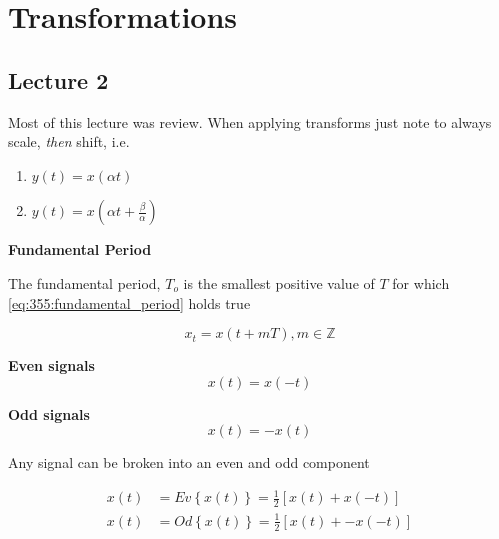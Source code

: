 \documentclass[10pt]{article}
\begin{document}
\section{Transformations}

\subsection{Lecture 2}
Most of this lecture was review. When applying transforms just note to always scale, \textit{then} shift, i.e.

\begin{enumerate}
	\item $ y(t) = x(\alpha t) $ 
	\item $ y(t) = x(\alpha t+\frac{\beta}{\alpha}) $ 
\end{enumerate}


\begin{definition}
	\textbf{Fundamental Period} 

	The fundamental period, $ T_o $  is the smallest positive value of $ T $ for which \eqref{eq:355:fundamental_period} holds true

	\begin{equation}
		x_t = x(t+ mT), m \in \mathbb{Z}
		\label{eq:355:fundamental_period}
	\end{equation}
\end{definition}

\begin{definition}
	\textbf{Even signals} 
	\begin{equation}
		x(t) = x(-t)
		\label{eq:355:even_signal}
	\end{equation}
\end{definition}

\begin{definition}
	\textbf{Odd signals} 
	\begin{equation}
		x(t) = -x(t)
		\label{eq:355:odd_signal}
	\end{equation}
\end{definition}


\begin{theorem}
	Any signal can be broken into an even and odd component

	\begin{equation}
		\begin{split}
			x(t) &= Ev \left\{ x(t) \right\} = \frac{1}{2} \left[ x(t) + x(-t) \right]  \\
			x(t) &= Od \left\{ x(t) \right\} = \frac{1}{2} \left[ x(t) + -x(-t) \right]  \\
		\end{split}
		\label{eq:355:even_odd_decomposition}
	\end{equation}
\end{theorem}
\end{document}
